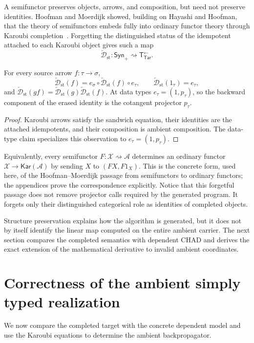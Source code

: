\documentclass[runningheads,envcountsame]{llncs}
\newcommand{\Synp}{\mathsf{Syn}_{+}}
\newcommand{\Tar}{\mathsf{Tar}}
\newcommand{\TotTar}{\mathsf T_{\Tar}^{\leftarrow}}
\newcommand{\Kar}{\mathsf{Kar}}
\newcommand{\Dst}{\overleftarrow{\mathcal D}_{\mathrm{st}}}
\newcommand{\semiarrow}{\rightsquigarrow}
\begin{document}
A semifunctor preserves objects, arrows, and composition, but need not preserve identities. Hoofman and Moerdijk showed, building on Hayashi and Hoofman, that the theory of semifunctors embeds fully into ordinary functor theory through Karoubi completion~\cite{Hayashi1985,Hoofman1993,HoofmanMoerdijk1995}. Forgetting the distinguished status of the idempotent attached to each Karoubi object gives such a map
$$
\Dst:\Synp\semiarrow\TotTar.
$$

\begin{proposition}
\label{prop:semi}
For every source arrow $f:\tau\to\sigma$,
$$
\Dst(f)=e_\sigma\circ\Dst(f)\circ e_\tau,
\qquad
\Dst(1_\tau)=e_\tau,
$$
and $\Dst(gf)=\Dst(g)\Dst(f)$. At data types $e_\tau=(1,p_\tau)$, so the backward component of the erased identity is the cotangent projector $p_\tau$.
\end{proposition}

\begin{proof}
Karoubi arrows satisfy the sandwich equation, their identities are the attached
idempotents, and their composition is ambient composition. The data-type claim
specializes this observation to $e_\tau=(1,p_\tau)$.
\end{proof}

Equivalently, every semifunctor $F:\mathcal X\semiarrow\mathcal A$ determines an ordinary functor $\mathcal X\to\Kar(\mathcal A)$ by sending $X$ to $(FX,F1_X)$. This is the concrete form, used here, of the Hoofman--Moerdijk passage from semifunctors to ordinary functors; the appendices prove the correspondence explicitly. Notice that this forgetful passage does not remove projector calls required by the generated program. It forgets only their distinguished categorical role as identities of completed objects.

Structure preservation explains how the algorithm is generated, but it does not by itself identify the linear map computed on the entire ambient carrier. The next section compares the completed semantics with dependent CHAD and derives the exact extension of the mathematical derivative to invalid ambient coordinates.

\section{Correctness of the ambient simply typed realization}
\label{sec:correctness}

We now compare the completed target with the concrete dependent model and use
the Karoubi equations to determine the ambient backpropagator.
\end{document}
